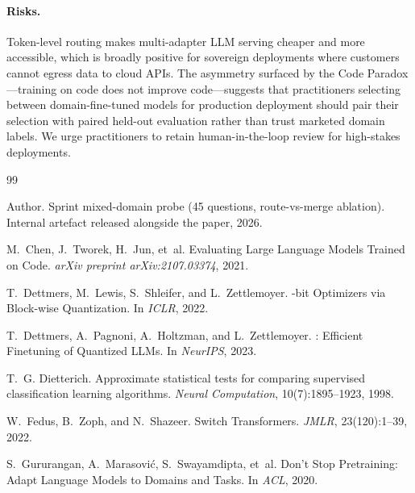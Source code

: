 \documentclass{article}
\begin{document}
\paragraph{Risks.} Token-level routing makes multi-adapter LLM serving cheaper and more accessible, which is broadly positive for sovereign deployments where customers cannot egress data to cloud APIs. The asymmetry surfaced by the Code Paradox---training on code does not improve code---suggests that practitioners selecting between domain-fine-tuned models for production deployment should pair their selection with paired held-out evaluation rather than trust marketed domain labels. We urge practitioners to retain human-in-the-loop review for high-stakes deployments.



\begin{thebibliography}{99}

Author.
\newblock Sprint mixed-domain probe (45 questions, route-vs-merge ablation).
\newblock Internal artefact released alongside the paper, 2026.

M.~Chen, J.~Tworek, H.~Jun, et~al.
\newblock Evaluating Large Language Models Trained on Code.
\newblock \emph{arXiv preprint arXiv:2107.03374}, 2021.

T.~Dettmers, M.~Lewis, S.~Shleifer, and L.~Zettlemoyer.
-bit Optimizers via Block-wise Quantization.
\newblock In \emph{ICLR}, 2022.

T.~Dettmers, A.~Pagnoni, A.~Holtzman, and L.~Zettlemoyer.
: Efficient Finetuning of Quantized {LLM}s.
\newblock In \emph{NeurIPS}, 2023.

T.~G. Dietterich.
\newblock Approximate statistical tests for comparing supervised classification learning algorithms.
\newblock \emph{Neural Computation}, 10(7):1895--1923, 1998.

W.~Fedus, B.~Zoph, and N.~Shazeer.
\newblock Switch Transformers.
\newblock \emph{JMLR}, 23(120):1--39, 2022.

S.~Gururangan, A.~Marasovi{\'c}, S.~Swayamdipta, et~al.
\newblock Don't Stop Pretraining: Adapt Language Models to Domains and Tasks.
\newblock In \emph{ACL}, 2020.


\end{thebibliography}
\end{document}
